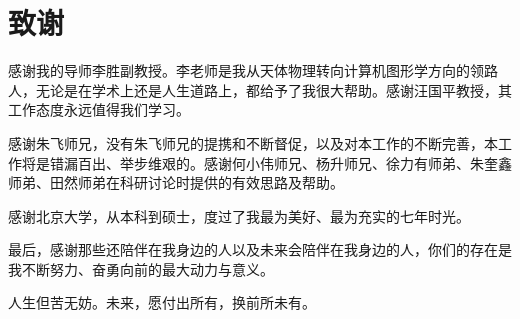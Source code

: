 \chapter{致谢}
感谢我的导师李胜副教授。李老师是我从天体物理转向计算机图形学方向的领路人，无论是在学术上还是人生道路上，都给予了我很大帮助。感谢汪国平教授，其工作态度永远值得我们学习。

感谢朱飞师兄，没有朱飞师兄的提携和不断督促，以及对本工作的不断完善，本工作将是错漏百出、举步维艰的。感谢何小伟师兄、杨升师兄、徐力有师弟、朱奎鑫师弟、田然师弟在科研讨论时提供的有效思路及帮助。

感谢北京大学，从本科到硕士，度过了我最为美好、最为充实的七年时光。

最后，感谢那些还陪伴在我身边的人以及未来会陪伴在我身边的人，你们的存在是我不断努力、奋勇向前的最大动力与意义。

人生但苦无妨。未来，愿付出所有，换前所未有。
